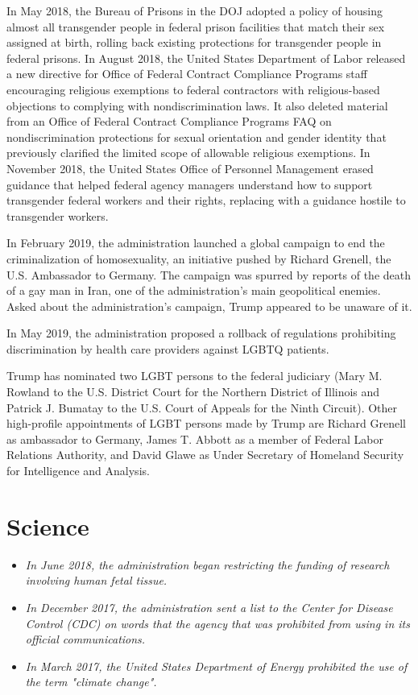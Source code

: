 In May 2018, the Bureau of Prisons in the DOJ adopted a policy of
housing almost all transgender people in federal prison facilities that
match their sex assigned at birth, rolling back existing protections for
transgender people in federal prisons. In August 2018, the United States
Department of Labor released a new directive for Office of Federal
Contract Compliance Programs staff encouraging religious exemptions to
federal contractors with religious-based objections to complying with
nondiscrimination laws. It also deleted material from an Office of
Federal Contract Compliance Programs FAQ on nondiscrimination
protections for sexual orientation and gender identity that previously
clarified the limited scope of allowable religious exemptions. In
November 2018, the United States Office of Personnel Management erased
guidance that helped federal agency managers understand how to support
transgender federal workers and their rights, replacing with a guidance
hostile to transgender workers.

In February 2019, the administration launched a global campaign to end
the criminalization of homosexuality, an initiative pushed by Richard
Grenell, the U.S. Ambassador to Germany. The campaign was spurred by
reports of the death of a gay man in Iran, one of the administration's
main geopolitical enemies. Asked about the administration's campaign,
Trump appeared to be unaware of it.

In May 2019, the administration proposed a rollback of regulations
prohibiting discrimination by health care providers against LGBTQ
patients.

Trump has nominated two LGBT persons to the federal judiciary (Mary M.
Rowland to the U.S. District Court for the Northern District of Illinois
and Patrick J. Bumatay to the U.S. Court of Appeals for the Ninth
Circuit). Other high-profile appointments of LGBT persons made by Trump
are Richard Grenell as ambassador to Germany, James T. Abbott as a
member of Federal Labor Relations Authority, and David Glawe as Under
Secretary of Homeland Security for Intelligence and Analysis.

\section{Science}\label{science}

\begin{itemize}
\item
  \emph{In June 2018, the administration began restricting the funding
  of research involving human fetal tissue.}
\item
  \emph{In December 2017, the administration sent a list to the Center
  for Disease Control (CDC) on words that the agency that was prohibited
  from using in its official communications.}
\item
  \emph{In March 2017, the United States Department of Energy prohibited
  the use of the term "climate change".}
\end{itemize}


